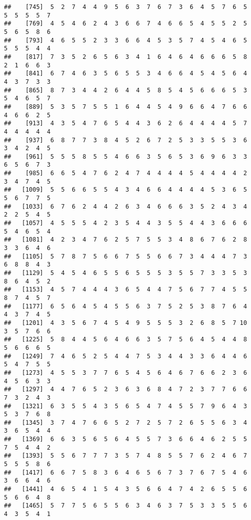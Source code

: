\documentclass[
]{book}
\begin{document}
\begin{verbatim}
##    [745]  5  2  7  4  4  9  5  6  3  7  6  7  3  6  4  5  7  6  5  5  5  5  5  7
##    [769]  4  5  4  6  2  4  3  6  6  7  4  6  6  5  4  5  5  2  5  5  6  5  8  6
##    [793]  4  6  5  5  2  3  3  6  6  4  5  3  5  7  4  5  4  6  5  5  5  5  4  4
##    [817]  7  3  5  2  6  5  6  3  4  1  6  4  6  4  6  6  6  5  8  2  1  6  6  3
##    [841]  6  7  4  6  3  5  6  5  5  3  4  6  6  4  5  4  5  6  4  4  3  7  3  3
##    [865]  8  7  3  4  4  2  6  4  4  5  8  5  4  5  6  6  6  5  3  5  4  6  5  7
##    [889]  5  3  5  7  5  5  1  6  4  4  5  4  9  6  6  4  7  6  6  4  6  6  2  5
##    [913]  4  3  5  4  7  6  5  4  4  3  6  2  6  4  4  4  4  5  7  4  4  4  4  4
##    [937]  6  8  7  7  3  8  4  5  2  6  7  2  5  3  3  5  5  3  6  3  4  2  4  5
##    [961]  5  5  5  8  5  5  4  6  6  3  5  6  5  3  6  9  6  3  3  6  5  6  7  3
##    [985]  6  6  5  4  7  6  2  4  7  4  4  4  4  5  4  4  4  4  2  3  4  7  4  5
##   [1009]  5  5  6  6  5  5  4  3  4  6  6  4  4  4  4  5  3  6  5  5  6  7  7  5
##   [1033]  6  7  6  2  4  4  2  6  3  4  6  6  6  3  5  2  4  3  4  2  2  5  4  5
##   [1057]  4  5  5  5  4  2  3  5  4  4  3  5  5  4  4  3  6  6  6  5  4  6  5  4
##   [1081]  4  2  3  4  7  6  2  5  7  5  5  3  4  8  6  7  6  2  8  3  3  6  4  6
##   [1105]  5  7  8  7  5  6  6  7  5  5  6  6  7  3  4  4  4  7  3  6  8  8  4  3
##   [1129]  5  4  5  4  6  5  5  6  5  5  5  3  5  5  7  3  3  5  3  8  6  4  5  2
##   [1153]  4  5  7  4  4  4  3  6  5  4  4  7  5  6  7  7  4  5  5  8  7  4  5  7
##   [1177]  6  5  6  4  5  4  5  5  6  3  7  5  2  5  3  8  7  6  4  4  3  7  4  5
##   [1201]  4  3  5  6  7  4  5  4  9  5  5  5  3  2  6  8  5  7 10  3  5  7  6  6
##   [1225]  5  8  4  4  5  6  4  6  6  3  5  7  5  6  4  5  4  4  8  5  6  6  6  5
##   [1249]  7  4  6  5  2  5  4  4  7  5  3  4  4  3  3  6  4  4  6  5  4  7  5  5
##   [1273]  4  5  5  3  7  7  6  5  4  5  6  4  6  7  6  6  2  3  6  4  5  6  3  3
##   [1297]  4  4  7  6  5  2  3  6  3  6  8  4  7  2  3  7  7  6  6  7  3  2  4  3
##   [1321]  6  3  5  5  4  3  5  6  5  4  7  4  5  5  7  9  6  4  3  5  3  7  6  8
##   [1345]  3  7  4  7  6  6  5  2  7  2  5  7  2  6  5  5  6  3  4  3  6  5  4  4
##   [1369]  6  6  3  5  6  5  6  4  5  5  7  3  6  6  4  6  2  5  5  7  5  4  4  2
##   [1393]  5  5  6  7  7  7  3  5  7  4  8  5  5  7  6  2  4  6  7  5  5  5  8  6
##   [1417]  6  6  7  5  8  3  6  4  6  5  6  7  3  7  6  7  5  4  6  3  6  6  4  6
##   [1441]  4  6  5  4  1  5  4  3  5  6  6  4  7  4  2  6  5  5  6  5  6  6  4  8
##   [1465]  5  7  7  5  6  5  5  6  3  4  6  3  7  5  3  3  5  5  6  4  3  5  4  1

\end{verbatim}
\end{document}
